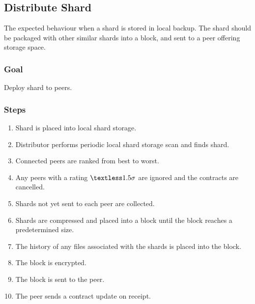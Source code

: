 \documentclass[11pt, a4paper, twocolumn, twoside]{report}
\begin{document}
\subsection{Distribute Shard}

The expected behaviour when a shard is stored in local backup. The shard should be packaged with other similar shards into a block, and sent to a peer offering storage space.

\subsubsection{Goal}

Deploy shard to peers.

\subsubsection{Steps}

\begin{enumerate}
 \item Shard is placed into local shard storage.
 \item Distributor performs periodic local shard storage scan and finds shard.
 \item Connected peers are ranked from best to worst.
 \item Any peers with a rating $\textless1.5 \sigma$ are ignored and the contracts are cancelled.
 \item Shards not yet sent to each peer are collected.
 \item Shards are compressed and placed into a block until the block reaches a predetermined size.
 \item The history of any files associated with the shards is placed into the block.
 \item The block is encrypted.
 \item The block is sent to the peer.
 \item The peer sends a contract update on receipt.
\end{enumerate}
\end{document}

